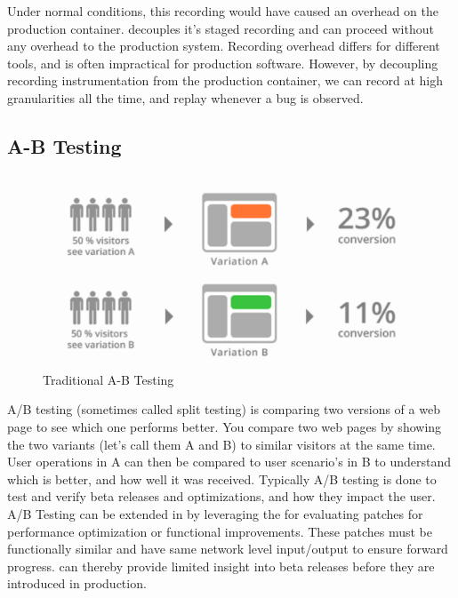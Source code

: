 Under normal conditions, this recording would have caused an overhead on the production container. 
\parikshan decouples it's staged recording and can proceed without any overhead to the production system.
Recording overhead differs for different tools, and is often impractical for production software. 
However, by decoupling recording instrumentation from the production container, we can record at high granularities all the time, and replay whenever a bug is observed.

\subsection{A-B Testing}

\begin{figure}[!ht]
	
	\centering
	\includegraphics[width=0.99\textwidth]{guided/figs/ABTesting.pdf}
	\caption{Traditional A-B Testing}
	\label{fig:abTesting}
\end{figure}

A/B testing (sometimes called split testing) is comparing two versions of a web page to see which one performs better. 
You compare two web pages by showing the two variants (let's call them A and B) to similar visitors at the same time.
User operations in A can then be compared to user scenario's in B to understand which is better, and how well it was received.
Typically A/B testing is done to test and verify beta releases and optimizations, and how they impact the user.
A/B Testing can be extended in \parikshan by leveraging the \debugcontainer  for evaluating patches for performance optimization or functional improvements. 
These patches must be functionally similar and have same network level input/output to ensure forward progress.
\parikshan can thereby provide limited insight into beta releases before they are introduced in production. 


